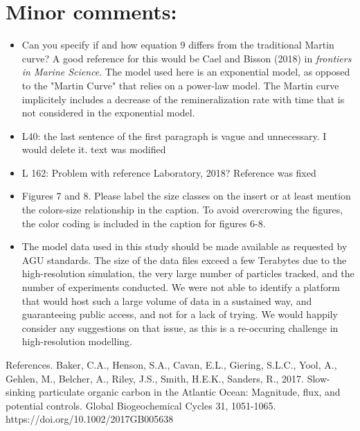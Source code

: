 \documentclass[12pt,letter]{article}
\begin{document}
\section*{Minor comments:}
\begin{itemize}
	\item Can you specify if and how equation 9 differs from the traditional Martin curve?
	{\color{blue} A good reference for this would be Cael and Bisson (2018) in \textit{frontiers in Marine Science}. The model used here is an exponential model, as opposed to the "Martin Curve" that relies on a power-law model. The Martin curve implicitely includes a decrease of the remineralization rate with time that is not considered in the exponential model.\\}

	\item L40: the last sentence of the first paragraph is vague and unnecessary. I would delete it.
	{\color{blue} text was modified\\}
	\item L 162: Problem with reference Laboratory, 2018?
	{\color{blue} Reference was fixed\\}
	\item Figures 7 and 8. Please label the size classes on the insert or at least mention the colors-size relationship in the caption.
	{\color{blue} To avoid overcrowing the figures, the color coding is included in the caption for figures 6-8.\\}


	\item The model data used in this study should be made available as requested by AGU standards.
	{\color{blue} The size of the data files exceed a few Terabytes due to the high-resolution simulation,  the very large number of particles tracked, and the number of experiments conducted. We were not able to identify a platform that would host such a large volume of data in a sustained way, and guaranteeing public access, and not for a lack of trying. We would happily consider any suggestions on that issue, as this is a re-occuring challenge in high-resolution modelling.\\}
\end{itemize}

References.
Baker, C.A., Henson, S.A., Cavan, E.L., Giering, S.L.C., Yool, A., Gehlen, M., Belcher, A., Riley, J.S., Smith, H.E.K., Sanders, R., 2017. Slow-sinking particulate organic carbon in the Atlantic Ocean: Magnitude, flux, and potential controls. Global Biogeochemical Cycles 31, 1051-1065. https://doi.org/10.1002/2017GB005638\\
\end{document}
